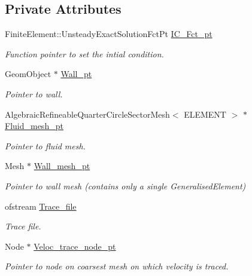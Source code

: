 \subsection*{Private Attributes}
\begin{DoxyCompactItemize}
\item 
Finite\+Element\+::\+Unsteady\+Exact\+Solution\+Fct\+Pt \hyperlink{classOscRingNStProblem_ad9b2810092588c7708660c5325c73256}{I\+C\+\_\+\+Fct\+\_\+pt}
\begin{DoxyCompactList}\small\item\em Function pointer to set the intial condition. \end{DoxyCompactList}\item 
Geom\+Object $\ast$ \hyperlink{classOscRingNStProblem_a1349ecb860cacb34792fde6807d92905}{Wall\+\_\+pt}
\begin{DoxyCompactList}\small\item\em Pointer to wall. \end{DoxyCompactList}\item 
Algebraic\+Refineable\+Quarter\+Circle\+Sector\+Mesh$<$ E\+L\+E\+M\+E\+NT $>$ $\ast$ \hyperlink{classOscRingNStProblem_af9ccaa9a5c41ffadda773d704793c76e}{Fluid\+\_\+mesh\+\_\+pt}
\begin{DoxyCompactList}\small\item\em Pointer to fluid mesh. \end{DoxyCompactList}\item 
Mesh $\ast$ \hyperlink{classOscRingNStProblem_aafee49228dbbee7178448da624b96c3f}{Wall\+\_\+mesh\+\_\+pt}
\begin{DoxyCompactList}\small\item\em Pointer to wall mesh (contains only a single Generalised\+Element) \end{DoxyCompactList}\item 
ofstream \hyperlink{classOscRingNStProblem_a37c1af48245859045bed1c3fc36be3da}{Trace\+\_\+file}
\begin{DoxyCompactList}\small\item\em Trace file. \end{DoxyCompactList}\item 
Node $\ast$ \hyperlink{classOscRingNStProblem_aed51269a285ffdc064739d6d363b1179}{Veloc\+\_\+trace\+\_\+node\+\_\+pt}
\begin{DoxyCompactList}\small\item\em Pointer to node on coarsest mesh on which velocity is traced. \end{DoxyCompactList}\item 

\end{DoxyCompactItemize}
